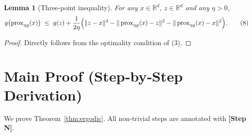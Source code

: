 \documentclass{article}
\newtheorem{lemma}{Lemma}
\newcommand{\prox}{\operatorname{prox}}
\newcommand{\R}{\mathbb{R}}
\begin{document}
\begin{lemma}[Three‑point inequality]\label{lem:three}
For any $x\in\R^{d}$, $z\in\R^{d}$ and any $\eta>0$,
\[
g\bigl(\prox_{\eta g}(x)\bigr)
\;\le\;
g(z)+\frac{1}{2\eta}\Bigl(\|z-x\|^{2}-\|\prox_{\eta g}(x)-z\|^{2}-\|\prox_{\eta g}(x)-x\|^{2}\Bigr).
\tag{8}
\]
\end{lemma}
\begin{proof}
Directly follows from the optimality condition of (3).  
\end{proof}

\section*{Main Proof (Step‑by‑Step Derivation)}
We prove Theorem~\ref{thm:ergodic}.  
All non‑trivial steps are annotated with \textbf{[Step N]}.
\end{document}

